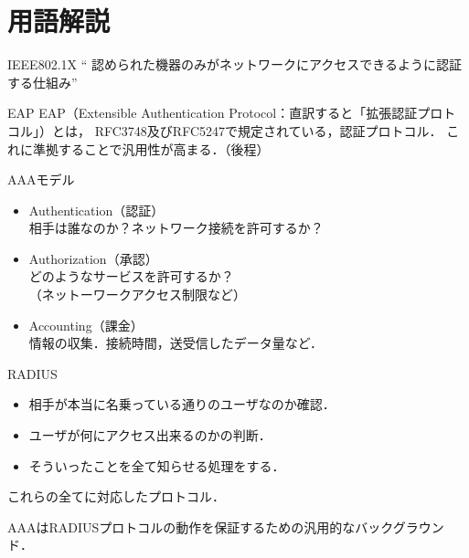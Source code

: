 \section{用語解説}
\begin{frame}[c]{\fft}
    \begin{block}{IEEE802.1X}
        `` 認められた機器のみがネットワークにアクセスできるように認証する仕組み''
    \end{block}
    \vfill
    \begin{block}{EAP}
        EAP（Extensible Authentication Protocol：直訳すると「拡張認証プロトコル」）とは，
        RFC3748及びRFC5247で規定されている，認証プロトコル．
        これに準拠することで汎用性が高まる．（後程）
    \end{block}
\end{frame}
\begin{frame}[c]{\fft}
    \begin{block}{AAAモデル}
        \begin{itemize}
            \item {\large A}uthentication（認証）\\
                  相手は誰なのか？ネットワーク接続を許可するか？
            \item {\large A}uthorization（承認）\\
                  どのようなサービスを許可するか？\\（ネットーワークアクセス制限など）
            \item {\large A}ccounting（課金）\\
                  情報の収集．接続時間，送受信したデータ量など．
        \end{itemize}
    \end{block}
\end{frame}
\begin{frame}[c]{\fft}
    \begin{block}{RADIUS}
        \begin{itemize}
            \item 相手が本当に名乗っている通りのユーザなのか確認．
            \item ユーザが何にアクセス出来るのかの判断．
            \item そういったことを全て知らせる処理をする．
        \end{itemize}
        これらの全てに対応したプロトコル．\par
        AAAはRADIUSプロトコルの動作を保証するための汎用的なバックグラウンド．
    \end{block}
\end{frame}